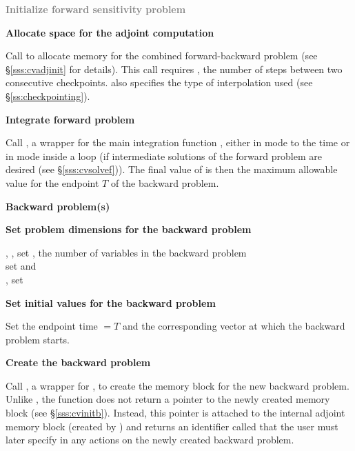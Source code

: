 \begin{Steps}
\item
  \textcolor{gray}{\bf Initialize forward sensitivity problem}

\item
  {\bf Allocate space for the adjoint computation}

  Call \id{()} to allocate memory for the 
  combined forward-backward problem (see \S\ref{sss:cvadjinit} for details).
  This call requires , the number of steps between two consecutive checkpoints.
   also specifies the type of interpolation used 
  (see \S\ref{ss:checkpointing}).

\item
  {\bf Integrate forward problem}

  Call , a wrapper for the {\cvodes} main integration
  function , either in  mode to the time 
   or in  mode inside a loop (if intermediate
  solutions of the forward problem are desired (see \S\ref{sss:cvsolvef})).
  The final value of  is then the maximum allowable value for the
  endpoint $T$ of the backward problem.

  \vspace{0.2in}\centerline{\bf Backward problem(s)}

 \item \label{i:back_start}
   {\bf Set problem dimensions for the backward problem}
   
   {\s, \omp, \pt} set , the number of variables in the backward problem \\
   {\p} set  and  \\
   {\omp, \pt} set 

\item
  {\bf Set initial values for the backward problem}

  Set the endpoint time  $= T$ and the corresponding vector 
  at which the backward problem starts.

\item
  {\bf Create the backward problem}

  Call , a wrapper for , to
  create the {\cvodes} memory block for the new backward problem. Unlike
  , the function  does not return a pointer to
  the newly created memory block (see \S\ref{sss:cvinitb}). Instead, this pointer
  is attached to the internal adjoint memory  block (created by )
  and returns an identifier called  that the user must later specify
  in any actions on the newly created backward problem.


\end{Steps}

